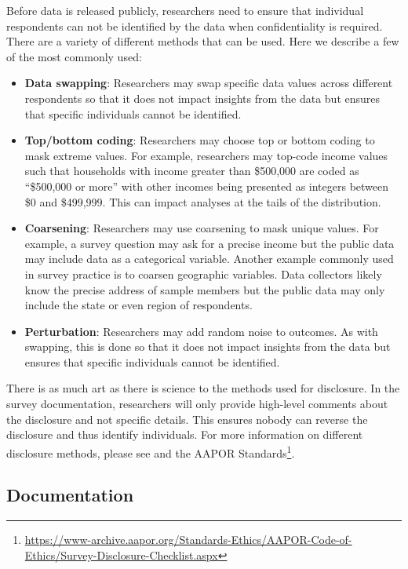 \documentclass[
]{krantz}
\providecommand{\tightlist}{%
  \setlength{\itemsep}{0pt}\setlength{\parskip}{0pt}}
\renewcommand{\href}[2]{#2\footnote{\url{#1}}}
\begin{document}
Before data is released publicly, researchers need to ensure that individual respondents can not be identified by the data when confidentiality is required. There are a variety of different methods that can be used. Here we describe a few of the most commonly used:

\begin{itemize}
\tightlist
\item
  \textbf{Data swapping}: Researchers may swap specific data values across different respondents so that it does not impact insights from the data but ensures that specific individuals cannot be identified.
\item
  \textbf{Top/bottom coding}: Researchers may choose top or bottom coding to mask extreme values. For example, researchers may top-code income values such that households with income greater than \$500,000 are coded as ``\$500,000 or more'' with other incomes being presented as integers between \$0 and \$499,999. This can impact analyses at the tails of the distribution.
\item
  \textbf{Coarsening}: Researchers may use coarsening to mask unique values. For example, a survey question may ask for a precise income but the public data may include data as a categorical variable. Another example commonly used in survey practice is to coarsen geographic variables. Data collectors likely know the precise address of sample members but the public data may only include the state or even region of respondents.
\item
  \textbf{Perturbation}: Researchers may add random noise to outcomes. As with swapping, this is done so that it does not impact insights from the data but ensures that specific individuals cannot be identified.
\end{itemize}

There is as much art as there is science to the methods used for disclosure. In the survey documentation, researchers will only provide high-level comments about the disclosure and not specific details. This ensures nobody can reverse the disclosure and thus identify individuals. For more information on different disclosure methods, please see \citet{Skinner2009} and the \href{https://www-archive.aapor.org/Standards-Ethics/AAPOR-Code-of-Ethics/Survey-Disclosure-Checklist.aspx}{AAPOR Standards}.

\hypertarget{overview-post-documentation}{%
\subsection{Documentation}\label{overview-post-documentation}}
\end{document}
